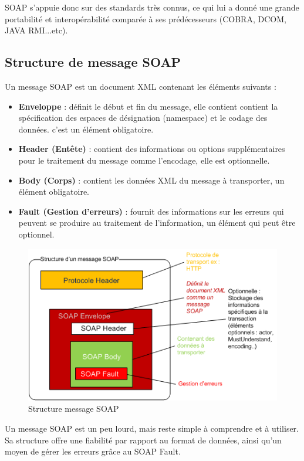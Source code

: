 SOAP s'appuie donc sur des standards très connus, ce qui lui a donné une grande portabilité et interopérabilité comparée à ses prédécesseurs (COBRA, DCOM, JAVA RMI...etc).
				
\subsection{Structure de message SOAP}
Un message SOAP est un document XML contenant les éléments suivants : \cite{refTutorialPointsSOAP}
\begin{itemize}
	\item \textbf{Enveloppe} : définit le début et fin du message, elle contient contient la spécification des espaces de désignation (namespace) et le codage des données. c'est un élément obligatoire.
	\item \textbf{Header (Entête)} : contient des informations ou options supplémentaires pour le traitement du message comme l'encodage, elle est optionnelle.
	\item \textbf{Body (Corps)} : contient les données XML du message à transporter, un élément obligatoire.
	\item \textbf{Fault (Gestion d'erreurs)} : fournit des informations sur les erreurs qui peuvent se produire au traitement de l'information, un élément qui peut être optionnel.
\end{itemize}
\begin{figure}[h]
	\begin{center}
		\includegraphics[scale=1]{img/soapmessagebody.png}
	\end{center}	
	\label{Structure message SOAP}
	\caption{Structure message SOAP}		
	\centering
\end{figure}			
Un message SOAP est un peu lourd, mais reste simple à comprendre et à utiliser. Sa structure offre une fiabilité par rapport au format de données, ainsi qu'un moyen de gérer les erreurs grâce au SOAP Fault.

